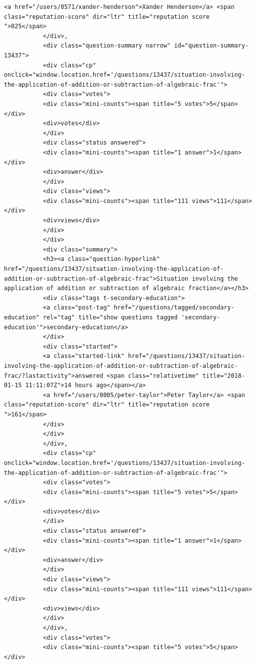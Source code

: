 \documentclass[11pt]{article}
\begin{document}
\begin{Verbatim}[commandchars=\\\{\}]
           <a href="/users/8571/xander-henderson">Xander Henderson</a> <span class="reputation-score" dir="ltr" title="reputation score ">825</span>
           </div>,
           <div class="question-summary narrow" id="question-summary-13437">
           <div class="cp" onclick="window.location.href='/questions/13437/situation-involving-the-application-of-addition-or-subtraction-of-algebraic-frac'">
           <div class="votes">
           <div class="mini-counts"><span title="5 votes">5</span></div>
           <div>votes</div>
           </div>
           <div class="status answered">
           <div class="mini-counts"><span title="1 answer">1</span></div>
           <div>answer</div>
           </div>
           <div class="views">
           <div class="mini-counts"><span title="111 views">111</span></div>
           <div>views</div>
           </div>
           </div>
           <div class="summary">
           <h3><a class="question-hyperlink" href="/questions/13437/situation-involving-the-application-of-addition-or-subtraction-of-algebraic-frac">Situation involving the application of addition or subtraction of algebraic fraction</a></h3>
           <div class="tags t-secondary-education">
           <a class="post-tag" href="/questions/tagged/secondary-education" rel="tag" title="show questions tagged 'secondary-education'">secondary-education</a>
           </div>
           <div class="started">
           <a class="started-link" href="/questions/13437/situation-involving-the-application-of-addition-or-subtraction-of-algebraic-frac/?lastactivity">answered <span class="relativetime" title="2018-01-15 11:11:07Z">14 hours ago</span></a>
           <a href="/users/8005/peter-taylor">Peter Taylor</a> <span class="reputation-score" dir="ltr" title="reputation score ">161</span>
           </div>
           </div>
           </div>,
           <div class="cp" onclick="window.location.href='/questions/13437/situation-involving-the-application-of-addition-or-subtraction-of-algebraic-frac'">
           <div class="votes">
           <div class="mini-counts"><span title="5 votes">5</span></div>
           <div>votes</div>
           </div>
           <div class="status answered">
           <div class="mini-counts"><span title="1 answer">1</span></div>
           <div>answer</div>
           </div>
           <div class="views">
           <div class="mini-counts"><span title="111 views">111</span></div>
           <div>views</div>
           </div>
           </div>,
           <div class="votes">
           <div class="mini-counts"><span title="5 votes">5</span></div>

\end{Verbatim}
\end{document}
